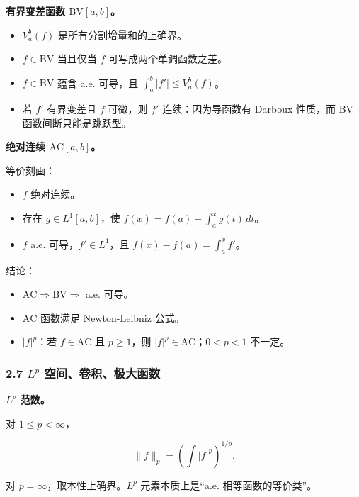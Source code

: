 \documentclass[
UTF8]{ctexart}
\providecommand{\tightlist}{%
\setlength{\itemsep}{0pt}\setlength{\parskip}{0pt}}
\begin{document}
\textbf{有界变差函数 \(\mathrm{BV}[a,b]\)。}

\begin{itemize}
    \tightlist
  \item
    \(V_a^b(f)\) 是所有分割增量和的上确界。
  \item
    \(f\in\mathrm{BV}\) 当且仅当 \(f\) 可写成两个单调函数之差。
  \item
    \(f\in\mathrm{BV}\) 蕴含 a.e. 可导，且 \(\int_a^b |f'|\le V_a^b(f)\)。
  \item
    若 \(f'\) 有界变差且 \(f\) 可微，则 \(f'\) 连续：因为导函数有 Darboux
    性质，而 BV 函数间断只能是跳跃型。
\end{itemize}

\textbf{绝对连续 \(\mathrm{AC}[a,b]\)。}

等价刻画：

\begin{itemize}
    \tightlist
  \item
    \(f\) 绝对连续。
  \item
    存在 \(g\in L^1[a,b]\)，使 \(f(x)=f(a)+\int_a^x g(t)\,dt\)。
  \item
    \(f\) a.e. 可导，\(f'\in L^1\)，且 \(f(x)-f(a)=\int_a^x f'\)。
\end{itemize}

结论：

\begin{itemize}
    \tightlist
  \item
    \(\mathrm{AC}\Rightarrow \mathrm{BV}\Rightarrow\) a.e. 可导。
  \item
    \(\mathrm{AC}\) 函数满足 Newton-Leibniz 公式。
  \item
    \(|f|^p\)：若 \(f\in\mathrm{AC}\) 且 \(p\ge1\)，则
    \(|f|^p\in \mathrm{AC}\)；\(0<p<1\) 不一定。
\end{itemize}

\subsubsection{\texorpdfstring{2.7 \(L^p\)
空间、卷积、极大函数}{2.7 L\^{}p 空间、卷积、极大函数}}\label{lp-ux7a7aux95f4ux5377ux79efux6781ux5927ux51fdux6570}

\textbf{\(L^p\) 范数。}

对 \(1\le p<\infty\)，

\[
  \|f\|_p=(\int |f|^p)^{1/p}.
\]

对 \(p=\infty\)，取本性上确界。\(L^p\) 元素本质上是``a.e.
相等函数的等价类''。
\end{document}
